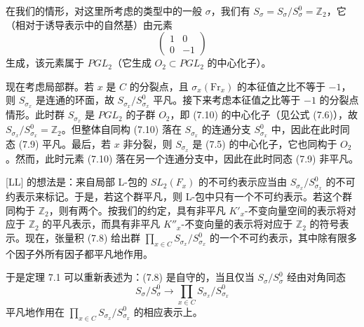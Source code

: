 在我们的情形，对这里所考虑的类型中的一般 $\sigma$，我们有 $S_\sigma=S_\sigma/S_\sigma^0=\mathbb{Z}_2$，它（相对于诱导表示中的自然基）由元素
\begin{equation}\tag{7.10}
\begin{pmatrix}1&0\\ 0&-1\end{pmatrix}
\end{equation}
生成，该元素属于 $PGL_2$（它生成 $O_2\subset PGL_2$ 的中心化子）。

现在考虑局部群。若 $x$ 是 $C$ 的分裂点，且 $\sigma_x(\mathrm{Fr}_x)$ 的本征值之比不等于 $-1$，则 $S_{\sigma_x}$ 是连通的环面，故 $S_{\sigma_x}/S_{\sigma_x}^0$ 平凡。接下来考虑本征值之比等于 $-1$ 的分裂点情形。此时群 $S_{\sigma_x}$ 是 $PGL_2$ 的子群 $O_2$，即 (7.10) 的中心化子（见公式 (7.6)），故 $S_{\sigma_x}/S_{\sigma_x}^0=\mathbb{Z}_2$。但整体自同构 (7.10) 落在 $S_{\sigma_x}$ 的连通分支 $S_{\sigma_x}^0$ 中，因此在此时同态 (7.9) 平凡。最后，若 $x$ 非分裂，则 $S_{\sigma_x}$ 是 (7.5) 的中心化子，它也同构于 $O_2$。然而，此时元素 (7.10) 落在另一个连通分支中，因此在此时同态 (7.9) 非平凡。

[LL] 的想法是：来自局部 L-包的 $SL_2(F_x)$ 的不可约表示应当由 $S_{\sigma_x}/S_{\sigma_x}^0$ 的不可约表示来标记。于是，若这个群平凡，则 L-包中只有一个不可约表示。若这个群同构于 $\mathbb{Z}_2$，则有两个。按我们的约定，具有非平凡 $K'_x$-不变向量空间的表示将对应于 $\mathbb{Z}_2$ 的平凡表示，而具有非平凡 $K''_x$-不变向量的表示将对应于 $\mathbb{Z}_2$ 的符号表示。现在，张量积 (7.8) 给出群 $\prod_{x\in C}S_{\sigma_x}/S_{\sigma_x}^0$ 的一个不可约表示，其中除有限多个因子外所有因子都平凡地作用。


于是定理 7.1 可以重新表述为：(7.8) 是自守的，当且仅当 $S_\sigma/S_\sigma^0$ 经由对角同态
\[
S_\sigma/S_\sigma^0\to\prod_{x\in C}S_{\sigma_x}/S_{\sigma_x}^0
\]
平凡地作用在 $\prod_{x\in C}S_{\sigma_x}/S_{\sigma_x}^0$ 的相应表示上。

